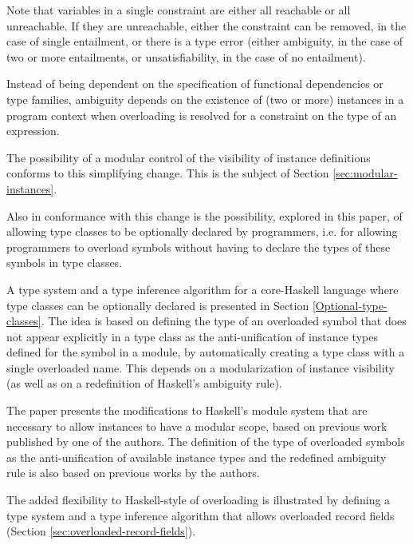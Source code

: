 Note that variables in a single constraint are either all reachable or
all unreachable. If they are unreachable, either the constraint can be
removed, in the case of single entailment, or there is a type error
(either ambiguity, in the case of two or more entailments, or
unsatisfiability, in the case of no entailment).

Instead of being dependent on the specification of functional
dependencies or type families, ambiguity depends on the existence of
(two or more) instances in a program context when overloading is
resolved for a constraint on the type of an expression.

The possibility of a modular control of the visibility of instance
definitions conforms to this simplifying change. This is the subject
of Section \ref{sec:modular-instances}. 

Also in conformance with this change is the possibility, explored in
this paper, of allowing type classes to be optionally declared by
programmers, i.e. for allowing programmers to overload symbols without
having to declare the types of these symbols in type classes.

A type system and a type inference algorithm for a core-Haskell
language where type classes can be optionally declared is presented in
Section \ref{Optional-type-classes}.  The idea is based on defining
the type of an overloaded symbol that does not appear explicitly in a
type class as the anti-unification of instance types defined for the
symbol in a module, by automatically creating a type class with a
single overloaded name. This depends on a modularization of instance
visibility (as well as on a redefinition of Haskell's ambiguity rule).

The paper presents the modifications to Haskell's module system that
are necessary to allow instances to have a modular scope, based on
previous work published by one of the authors. The definition of the
type of overloaded symbols as the anti-unification of available
instance types and the redefined ambiguity rule is also based on
previous works by the authors.

The added flexibility to Haskell-style of overloading is illustrated
by defining a type system and a type inference algorithm that allows
overloaded record fields (Section \ref{sec:overloaded-record-fields}).


